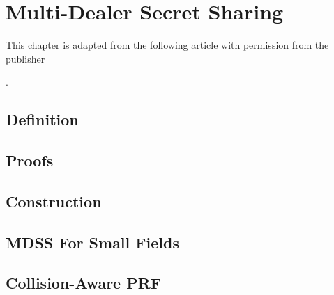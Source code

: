 \chapter{Multi-Dealer Secret Sharing} \label{chap:mdss}

\begin{singlespace}         %
	This chapter is adapted from the following article with permission from the publisher

	.
\end{singlespace}

% 

\section{Definition}\label{sec:mdss-definition}


\section{Proofs}


\section{Construction}


\section{MDSS For Small Fields}
\label{sec:mdss-sf}


\section{Collision-Aware PRF}


